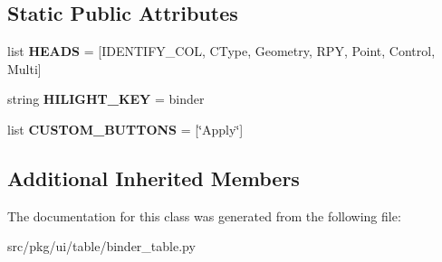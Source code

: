\subsection*{Static Public Attributes}
\begin{DoxyCompactItemize}
\item 
\mbox{\label{classrnb-planning_1_1src_1_1pkg_1_1ui_1_1table_1_1binder__table_1_1_binder_table_a5805f69f6e9b4a142a873e929eaaf7b6}} 
list {\bfseries H\+E\+A\+DS} = \mbox{[}I\+D\+E\+N\+T\+I\+F\+Y\+\_\+\+C\+OL, \textquotesingle{}C\+Type\textquotesingle{}, \textquotesingle{}Geometry\textquotesingle{}, \textquotesingle{}R\+PY\textquotesingle{}, \textquotesingle{}Point\textquotesingle{}, \textquotesingle{}Control\textquotesingle{}, \textquotesingle{}Multi\textquotesingle{}\mbox{]}
\item 
\mbox{\label{classrnb-planning_1_1src_1_1pkg_1_1ui_1_1table_1_1binder__table_1_1_binder_table_aea4f258cd521410c84ff35c83256caba}} 
string {\bfseries H\+I\+L\+I\+G\+H\+T\+\_\+\+K\+EY} = \textquotesingle{}binder\textquotesingle{}
\item 
\mbox{\label{classrnb-planning_1_1src_1_1pkg_1_1ui_1_1table_1_1binder__table_1_1_binder_table_a4520722006654ee7c12749a4b38ec25d}} 
list {\bfseries C\+U\+S\+T\+O\+M\+\_\+\+B\+U\+T\+T\+O\+NS} = \mbox{[}\char`\"{}Apply\char`\"{}\mbox{]}
\end{DoxyCompactItemize}
\subsection*{Additional Inherited Members}


The documentation for this class was generated from the following file\+:\begin{DoxyCompactItemize}
\item 
src/pkg/ui/table/binder\+\_\+table.\+py\end{DoxyCompactItemize}
